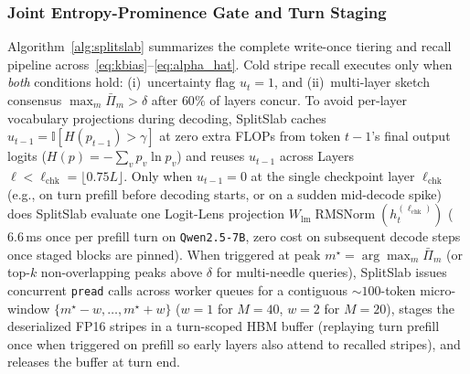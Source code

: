 \documentclass[final,5p,times,twocolumn]{elsarticle}
\theoremstyle{definition}
\theoremstyle{remark}
\newcounter{alg}
\newcommand{\SplitSlab}{\textup{\textsc{SplitSlab}}}
\newcommand{\RMSNorm}{\operatorname{RMSNorm}}
\def\SplitSlab{SplitSlab}%
\begin{document}
\subsubsection{Joint Entropy-Prominence Gate and Turn Staging}
Algorithm~\ref{alg:splitslab} summarizes the complete write-once tiering and recall pipeline across~\eqref{eq:kbias}--\eqref{eq:alpha_hat}. Cold stripe recall executes only when \emph{both} conditions hold: (i)~uncertainty flag $u_t = 1$, and (ii)~multi-layer sketch consensus $\max_m \bar{\Pi}_m > \delta$ after $60\%$ of layers concur. To avoid per-layer vocabulary projections during decoding, \SplitSlab{} caches $u_{t-1} = \mathbb{I}[H(p_{t-1}) > \gamma]$ at zero extra FLOPs from token $t-1$'s final output logits ($H(p) = -\sum_v p_v\ln p_v$) and reuses $u_{t-1}$ across Layers $\ell < \ell_{\mathrm{chk}} = \lfloor 0.75 L \rfloor$. Only when $u_{t-1} = 0$ at the single checkpoint layer $\ell_{\mathrm{chk}}$ (e.g., on turn prefill before decoding starts, or on a sudden mid-decode spike) does \SplitSlab{} evaluate one Logit-Lens projection $W_{\mathrm{lm}}\RMSNorm(h_t^{(\ell_{\mathrm{chk}})})$ ($6.6$\,ms once per prefill turn on \texttt{Qwen2.5-7B}, zero cost on subsequent decode steps once staged blocks are pinned). When triggered at peak $m^\star = \arg\max_m \bar{\Pi}_m$ (or top-$k$ non-overlapping peaks above $\delta$ for multi-needle queries), \SplitSlab{} issues concurrent \texttt{pread} calls across worker queues for a contiguous $\sim\!100$-token micro-window $\{m^\star - w,\dots,m^\star + w\}$ ($w = 1$ for $M=40$, $w=2$ for $M=20$), stages the deserialized FP16 stripes in a turn-scoped HBM buffer (replaying turn prefill once when triggered on prefill so early layers also attend to recalled stripes), and releases the buffer at turn end.
\end{document}
